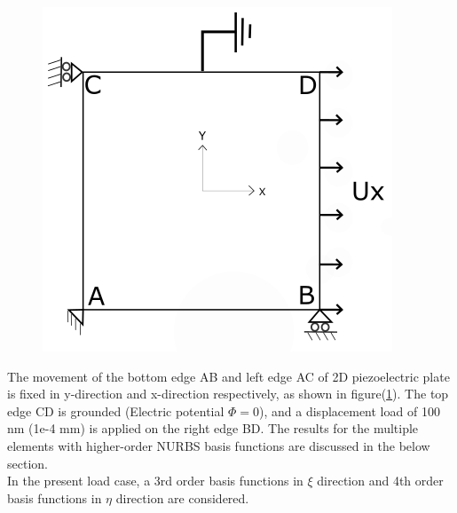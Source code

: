 \documentclass[12pt]{article}
\begin{document}
\begin{figure}[H]
\begin{minipage}{.5\textwidth}
		\includegraphics[width=1\linewidth]{Grounded.png}
		\label{EMLoading}
	\end{minipage}
\end{figure}
The movement of the bottom edge AB and left edge AC of 2D piezoelectric plate is fixed in y-direction and x-direction respectively, as shown in figure(\ref{EMLoading}).
The top edge CD is grounded (Electric potential $\Phi = 0$), and a displacement load of 100 nm (1e-4 mm) is applied on the right edge BD. The results for the multiple elements with higher-order NURBS basis functions are discussed in the below
section. \\
In the present load case, a 3rd order basis functions in $\xi$ direction and 4th order basis functions in $\eta$ direction are considered.\\

\newpage
\end{document}
